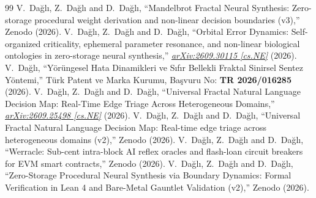 \documentclass[11pt,a4paper]{article}
\begin{document}
\begin{thebibliography}{99}
 V.~Dağlı, Z.~Dağlı and D.~Dağlı, ``Mandelbrot Fractal Neural Synthesis: Zero-storage procedural weight derivation and non-linear decision boundaries (v3),'' Zenodo (2026). 
 V.~Dağlı, Z.~Dağlı and D.~Dağlı, ``Orbital Error Dynamics: Self-organized criticality, ephemeral parameter resonance, and non-linear biological ontologies in zero-storage neural synthesis,'' \href{https://arxiv.org/abs/2609.30115}{\emph{arXiv:2609.30115 [cs.NE]}} (2026). 
 V.~Dağlı, ``Yörüngesel Hata Dinamikleri ve Sıfır Bellekli Fraktal Sinirsel Sentez Yöntemi,'' Türk Patent ve Marka Kurumu, Başvuru No: \textbf{TR 2026/016285} (2026).
 V.~Dağlı, Z.~Dağlı and D.~Dağlı, ``Universal Fractal Natural Language Decision Map: Real-Time Edge Triage Across Heterogeneous Domains,'' \href{https://arxiv.org/abs/2609.25498}{\emph{arXiv:2609.25498 [cs.NE]}} (2026). 
 V.~Dağlı, Z.~Dağlı and D.~Dağlı, ``Universal Fractal Natural Language Decision Map: Real-time edge triage across heterogeneous domains (v2),'' Zenodo (2026). 
 V.~Dağlı, Z.~Dağlı and D.~Dağlı, ``Werracle: Sub-cent intra-block AI reflex oracles and flash-loan circuit breakers for EVM smart contracts,'' Zenodo (2026). 
 V.~Dağlı, Z.~Dağlı and D.~Dağlı, ``Zero-Storage Procedural Neural Synthesis via Boundary Dynamics: Formal Verification in Lean 4 and Bare-Metal Gauntlet Validation (v2),'' Zenodo (2026). 
\end{thebibliography}
\end{document}
